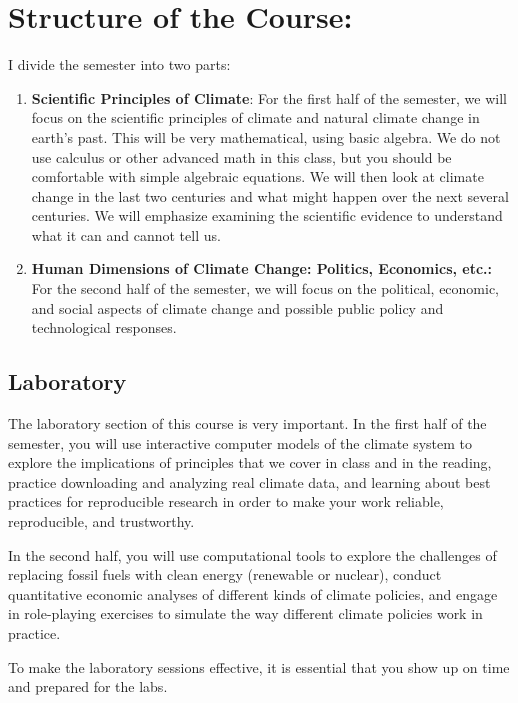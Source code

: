 \documentclass[11pt,twoside]{jgsyllabus}\usepackage[]{graphicx}\usepackage[]{color}
\begin{document}
\section[Structure]{Structure of the Course:}
I divide the semester into two parts:
\begin{enumerate}
    \item \textbf{Scientific Principles of Climate}: For the first half of the
    semester, we will focus on the scientific principles of climate and natural
    climate change in earth's past. This will be very mathematical, using basic %
    algebra. We do not use calculus or other advanced math in this class, but
    you should be comfortable with simple algebraic equations.
    We will then look at climate change in the last two centuries and what might
    happen over the next several centuries. We will emphasize examining the
    scientific evidence to understand what it can and cannot tell us.
    \item \textbf{Human Dimensions of Climate Change: Politics, Economics, etc.:}
    For the second half of the semester, we will focus on the political,
    economic, and social aspects of climate change and possible public policy
    and technological responses.
\end{enumerate}
%
%
%
\subsection{Laboratory}
The laboratory section of this course is very important.
In the first half of the semester, you will use interactive computer models of
the climate system to explore the implications of principles that we cover in
class and in the reading, practice downloading and analyzing real climate data,
and learning about best practices for reproducible research in order to make
your work reliable, reproducible, and trustworthy.

In the second half, you will use computational tools to explore the challenges
of replacing fossil fuels with clean energy (renewable or nuclear), conduct
quantitative economic analyses of different kinds of climate policies, and
engage in role-playing exercises to simulate the way different climate policies
work in practice.

To make the laboratory sessions effective, it is essential that you show up on
time and prepared for the labs.
\end{document}
